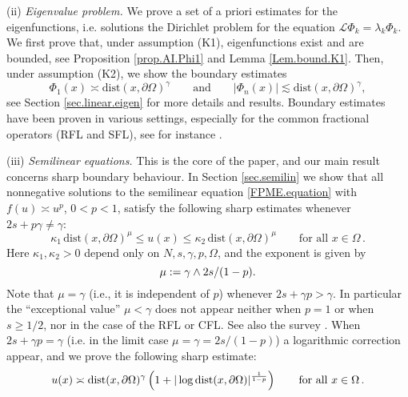 \documentclass[11pt]{article}
\numberwithin{equation}{section}
\newcommand{\A}{\mathcal{L}}
\def\dist{\mathrm{dist}} %
\begin{document}
\medskip

\noindent (ii) \textit{Eigenvalue problem. }We  prove a set of a priori estimates for the eigenfunctions, i.e. solutions the Dirichlet problem for the equation $\A \Phi_k=\lambda_k \Phi_k$. We first prove that, under assumption (K1),  eigenfunctions exist and are bounded,
see Proposition \ref{prop.AI.Phi1} and Lemma \ref{Lem.bound.K1}. Then, under assumption (K2), we show the  boundary estimates
\[
\Phi_1(x)\asymp \dist(x,\partial\Omega)^\gamma\qquad\mbox{and}\qquad |\Phi_n(x)|\lesssim \dist(x,\partial\Omega)^\gamma,
\]
see Section \ref{sec.linear.eigen} for more details and results.
Boundary estimates have been proven in various settings,  especially for the common fractional operators (RFL and SFL),   see for instance \cite{BG,BSV2013,Cabre-Tan,CDDS,CS2016,Davies1,Grub1, RosSer, RosSer1, RosSer2, SV1,SV2003}.


\noindent(iii) \textit{Semilinear equations. }
This is the core of the paper, and our main result concerns sharp boundary behaviour.   In Section \ref{sec.semilin} we show that all nonnegative solutions to the semilinear equation \eqref{FPME.equation} with $f(u)\asymp u^p$, $0<p<1$,    satisfy the following sharp estimates whenever $2s+p\gamma \ne \gamma$:
\begin{equation}\label{01}
\kappa_1 \,\dist(x,\partial\Omega)^{\mu} \le
u(x) \le \kappa_2\,  \dist(x,\partial\Omega)^{\mu}\qquad\mbox{for all $x\in \Omega$}\,.
\end{equation}
Here $\kappa_1,\kappa_2>0$ depend only on $N,s,\gamma,p,\Omega$, and the exponent is given by\vspace{-1mm}
\begin{equation}
\label{eq:mu}
\mu:=\gamma\wedge2s/(1-p).\vspace{-1mm}
\end{equation}
Note that $\mu=\gamma$ (i.e., it is independent of $p$) whenever $2s+\gamma p>\gamma$. In particular the ``exceptional value'' $\mu<\gamma$ does not appear neither when $p=1$ or when $s\ge1/2$,   nor in the case of the RFL or CFL.   See also the survey \cite{RosOton1}.  When $2s+\gamma p=\gamma$ (i.e. in the limit case $\mu=\gamma=2s/(1-p)$) a logarithmic correction
appear, and we prove the following sharp estimate:\vspace{-1mm}
\begin{equation}\label{01.log}
u(x) \asymp \dist(x,\partial\Omega)^{\gamma} \left(1+|\log \dist(x,\partial\Omega)|^{\frac{1}{1-p}}\right)\qquad\mbox{for all $x\in \Omega$}\,.\vspace{-1mm}
\end{equation}
\end{document}
